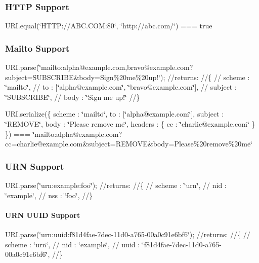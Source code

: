 \subsubsection*{H\+T\+TP Support}

U\+R\+I.\+equal(\char`\"{}\+H\+T\+T\+P\+://\+A\+B\+C.\+C\+O\+M\+:80\char`\"{}, \char`\"{}http\+://abc.\+com/\char`\"{}) === true

\subsubsection*{Mailto Support}

U\+R\+I.\+parse(\char`\"{}mailto\+:alpha@example.\+com,bravo@example.\+com?subject=\+S\+U\+B\+S\+C\+R\+I\+B\+E\&body=\+Sign\%20me\%20up!\char`\"{}); //returns\+: //\{ // scheme \+: \char`\"{}mailto\char`\"{}, // to \+: \mbox{[}\char`\"{}alpha@example.\+com\char`\"{}, \char`\"{}bravo@example.\+com\char`\"{}\mbox{]}, // subject \+: \char`\"{}\+S\+U\+B\+S\+C\+R\+I\+B\+E\char`\"{}, // body \+: \char`\"{}\+Sign me up!\char`\"{} //\}

U\+R\+I.\+serialize(\{ scheme \+: \char`\"{}mailto\char`\"{}, to \+: \mbox{[}\char`\"{}alpha@example.\+com\char`\"{}\mbox{]}, subject \+: \char`\"{}\+R\+E\+M\+O\+V\+E\char`\"{}, body \+: \char`\"{}\+Please remove me\char`\"{}, headers \+: \{ cc \+: \char`\"{}charlie@example.\+com\char`\"{} \} \}) === \char`\"{}mailto\+:alpha@example.\+com?cc=charlie@example.\+com\&subject=\+R\+E\+M\+O\+V\+E\&body=\+Please\%20remove\%20me\char`\"{}

\subsubsection*{U\+RN Support}

U\+R\+I.\+parse(\char`\"{}urn\+:example\+:foo\char`\"{}); //returns\+: //\{ // scheme \+: \char`\"{}urn\char`\"{}, // nid \+: \char`\"{}example\char`\"{}, // nss \+: \char`\"{}foo\char`\"{}, //\}

\paragraph*{U\+RN U\+U\+ID Support}

U\+R\+I.\+parse(\char`\"{}urn\+:uuid\+:f81d4fae-\/7dec-\/11d0-\/a765-\/00a0c91e6bf6\char`\"{}); //returns\+: //\{ // scheme \+: \char`\"{}urn\char`\"{}, // nid \+: \char`\"{}example\char`\"{}, // uuid \+: \char`\"{}f81d4fae-\/7dec-\/11d0-\/a765-\/00a0c91e6bf6\char`\"{}, //\}

